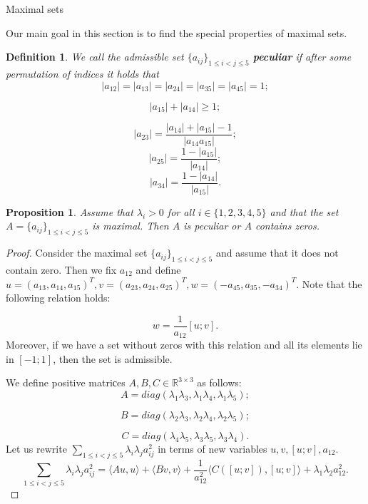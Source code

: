 \documentclass[12pt]{article}
\newtheorem{proposition}{Proposition}[section]
\newtheorem{definition}{Definition}[section]
\begin{document}
\begin{section}{Maximal sets}
\label{s6}

    Our main goal in this section is to find the special properties of maximal sets.
    
    \begin{definition}
    \label{def-bad}
        We call the admissible set $\{a_{ij}\}_{1\leq i<j\leq 5}$  \textbf{ peculiar} if after some permutation of indices it holds that 
        $$
            |a_{12}|=|a_{13}|=|a_{24}|=|a_{35}|=|a_{45}|=1;
        $$ 
        
        $$
            |a_{15}| + |a_{14}|\geq 1;
        $$ 
        
        $$
            |a_{23}| = \frac{|a_{14}| + |a_{15}| - 1}{|a_{14}a_{15}|};
        $$
        $$
            |a_{25}| = \frac{1-|a_{15}|}{|a_{14}|};
        $$
        $$
            |a_{34}| = \frac{1-|a_{14}|}{|a_{15}|}.
        $$
    \end{definition}
    
    \begin{proposition}
        \label{max-form}
        Assume that $\lambda_{i}> 0$ for all $i\in\{1,2,3,4,5\}$ and that the set $A=\{a_{ij}\}_{1\leq i<j\leq 5}$ is maximal. Then $A$ is  peculiar or $A$ contains zeros. 
    \end{proposition}
    
    \begin{proof}
        Consider the maximal set $\{a_{ij}\}_{1\leq i < j\leq 5}$ and assume that it does not contain zero. Then we fix $a_{12}$ and define $u=(a_{13}, a_{14}, a_{15})^{T}, v=(a_{23},a_{24},a_{25})^{T}, w = (-a_{45},a_{35},-a_{34})^{T}$. Note that the following relation holds:
    
        $$
            w = \frac{1}{a_{12}}[u; v].
        $$
        Moreover, if we have a set without zeros with this relation and all its elements lie in $[-1;1]$, then the set is admissible. 
    
         We define positive matriсes $A,B,C \in \mathbb{R}^{3\times 3}$ as follows:  
        $$
            A = diag(\lambda_{1}\lambda_{3}, \lambda_{1}\lambda_{4},\lambda_{1}\lambda_{5});
        $$ 
        
        $$
            B = diag(\lambda_{2}\lambda_{3}, \lambda_{2}\lambda_{4},\lambda_{2}\lambda_{5});
        $$
        
        $$ 
            C = diag(\lambda_{4}\lambda_{5}, \lambda_{3}\lambda_{5},\lambda_{3}\lambda_{4}).
        $$ 
        Let us rewrite $\sum_{1\leq i < j\leq 5}\lambda_{i}\lambda_{j} a_{ij}^{2}$ in terms of new variables $u,v,[u;v], a_{12}$.
        $$
            \sum_{1\leq i < j\leq 5}\lambda_{i}\lambda_{j} a_{ij}^{2} = \langle Au, u\rangle + \langle Bv, v\rangle + \frac{1}{a_{12}^2}\langle C ([u;v]), [u;v]\rangle + \lambda_{1}\lambda_{2}a_{12}^2.
        $$
    

\end{proof}
\end{section}
\end{document}
